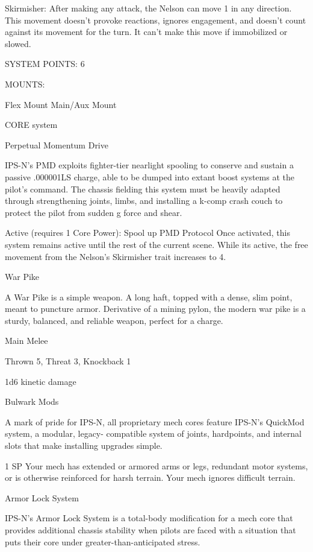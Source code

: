   Skirmisher: After making any attack, the Nelson can move 1 in any direction. This movement doesn’t
  provoke reactions, ignores engagement, and doesn’t count against its movement for the turn. It can’t
  make this move if immobilized or slowed.

                                               SYSTEM POINTS: 6

                                                    MOUNTS:

  Flex Mount                          Main/Aux Mount

                                                  CORE system




                                             Perpetual Momentum Drive

  IPS-N’s PMD exploits fighter-tier nearlight spooling to conserve and sustain a passive .000001LS
  charge, able to be dumped into extant boost systems at the pilot’s command. The chassis fielding this
  system must be heavily adapted through strengthening joints, limbs, and installing a k-comp crash
  couch to protect the pilot from sudden g force and shear.

  Active (requires 1 Core Power): Spool up PMD
   Protocol
   Once activated, this system remains active until the rest of the current scene. While its active, the free
   movement from the Nelson’s Skirmisher trait increases to 4.

War Pike

A War Pike is a simple weapon. A long haft, topped with a dense, slim point, meant to puncture armor.
Derivative of a mining pylon, the modern war pike is a sturdy, balanced, and reliable weapon, perfect for a
charge.

Main Melee

Thrown 5, Threat 3, Knockback 1

1d6 kinetic damage


Bulwark Mods

A mark of pride for IPS-N, all proprietary mech cores feature IPS-N’s QuickMod system, a modular, legacy-
compatible system of joints, hardpoints, and internal slots that make installing upgrades simple.

1 SP
Your mech has extended or armored arms or legs, redundant motor systems, or is otherwise
reinforced for harsh terrain. Your mech ignores difficult terrain.


Armor Lock System

IPS-N’s Armor Lock System is a total-body modification for a mech core that provides additional chassis
stability when pilots are faced with a situation that puts their core under greater-than-anticipated stress.

